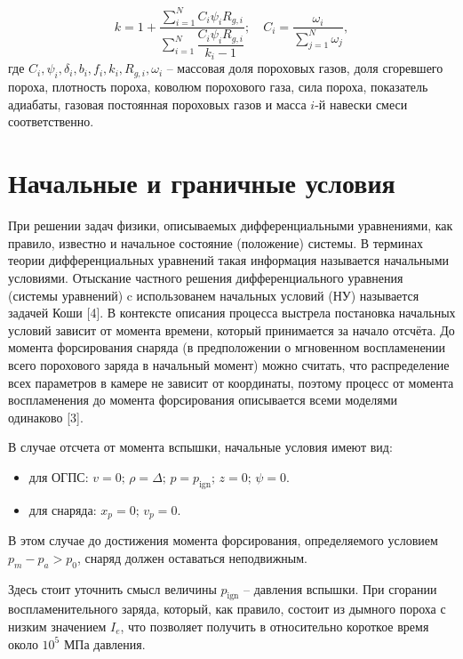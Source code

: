 \documentclass[14pt, a4paper]{report} %
\begin{document}
\begin{equation}
k = 1 + \frac{\sum_{i=1}^N C_i \psi_i R_{g,i}}{\sum_{i=1}^N \dfrac{C_i \psi_i R_{g,i}}{k_i - 1}}; \quad C_i = \frac{\omega_i}{\sum_{j=1}^N \omega_j},
\end{equation}
где \( C_i, \psi_i, \delta_i, b_i, f_i, k_i, R_{g,i}, \omega_i \) -- массовая доля пороховых газов, доля сгоревшего пороха, плотность пороха, коволюм порохового газа, сила пороха, показатель адиабаты, газовая постоянная пороховых газов и масса \(i\)-й навески смеси соответственно.

\section{Начальные и граничные условия}

При решении задач физики, описываемых дифференциальными уравнениями, как правило, известно и начальное состояние (положение) системы. В терминах теории дифференциальных уравнений такая информация называется начальными условиями. Отыскание частного решения дифференциального уравнения (системы уравнений) c использованем начальных условий (НУ) называется задачей Коши [4].
В контексте описания процесса выстрела постановка начальных условий зависит от момента времени, который принимается за начало отсчёта.
До момента форсирования снаряда (в
предположении о мгновенном воспламенении всего порохового заряда в
начальный момент) можно считать, что распределение всех параметров в
камере не зависит от координаты, поэтому процесс от момента воспламенения
до момента форсирования описывается всеми моделями одинаково [3].

В случае отсчета от момента вспышки, начальные условия имеют вид:

\begin{itemize}
    \item для ОГПС: \( v = 0; \, \rho = \Delta; \, p = p_{\text{ign}}; \, z = 0; \, \psi = 0. \)
    \item для снаряда: \( x_p = 0; \, v_p = 0. \)
\end{itemize}

В этом случае до достижения момента форсирования, определяемого условием \( p_m - p_a > p_0 \), снаряд должен оставаться неподвижным.

Здесь стоит уточнить смысл величины $p_{\text{ign}}$ -- давления вспышки. При сгорании воспламенительного заряда, который, как правило, состоит из дымного пороха с низким значением $I_e$, что позволяет получить в относительно короткое время около $10^5$ МПа давления.
\end{document}
